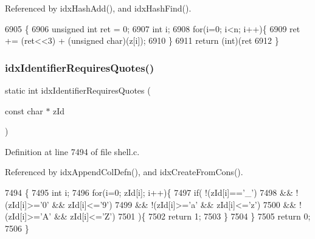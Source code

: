 Referenced by idx\+Hash\+Add(), and idx\+Hash\+Find().


\begin{DoxyCode}
6905                                               \{
6906   \textcolor{keywordtype}{unsigned} \textcolor{keywordtype}{int} ret = 0;
6907   \textcolor{keywordtype}{int} i;
6908   \textcolor{keywordflow}{for}(i=0; i<n; i++)\{
6909     ret += (ret<<3) + (\textcolor{keywordtype}{unsigned} \textcolor{keywordtype}{char})(z[i]);
6910   \}
6911   \textcolor{keywordflow}{return} (\textcolor{keywordtype}{int})(ret %
6912 \}
\end{DoxyCode}
\mbox{\label{shell_8c_aaf67b2870bc586f80d1547513d359301}} 
\subsubsection{idx\+Identifier\+Requires\+Quotes()}
{\footnotesize\ttfamily static int idx\+Identifier\+Requires\+Quotes (\begin{DoxyParamCaption}\item[{const char $\ast$}]{z\+Id }\end{DoxyParamCaption})\hspace{0.3cm}{\ttfamily [static]}}



Definition at line 7494 of file shell.\+c.



Referenced by idx\+Append\+Col\+Defn(), and idx\+Create\+From\+Cons().


\begin{DoxyCode}
7494                                                        \{
7495   \textcolor{keywordtype}{int} i;
7496   \textcolor{keywordflow}{for}(i=0; zId[i]; i++)\{
7497     \textcolor{keywordflow}{if}( !(zId[i]==\textcolor{charliteral}{'\_'})
7498      && !(zId[i]>=\textcolor{charliteral}{'0'} && zId[i]<=\textcolor{charliteral}{'9'})
7499      && !(zId[i]>=\textcolor{charliteral}{'a'} && zId[i]<=\textcolor{charliteral}{'z'})
7500      && !(zId[i]>=\textcolor{charliteral}{'A'} && zId[i]<=\textcolor{charliteral}{'Z'})
7501     )\{
7502       \textcolor{keywordflow}{return} 1;
7503     \}
7504   \}
7505   \textcolor{keywordflow}{return} 0;
7506 \}
\end{DoxyCode}
\mbox{\label{shell_8c_a3561fea8a2e8d2b55a17e22c50b6ac0f}} 
